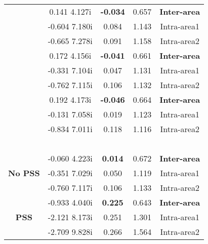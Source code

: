 \documentclass[conference,11pt]{IEEEtran}
\begin{document}
\begin{table}[t]
\begin{tabular}{||c|c|c|c|c||}
\hline 
\multirow{3}{*}{\centering {10\%WG}}    &0.141	 4.127i&	\bf{-0.034}&	0.657& \bf{Inter-area}\\
{}                                          &-0.604	 7.180i&	0.084&	1.143& Intra-area1\\
{}                                          &-0.665	 7.278i&	0.091&	1.158& Intra-area2\\ \hline
\multirow{3}{*}{\centering {25\%WG}}   &0.172	 4.156i&	\bf{-0.041}&	0.661& \bf{Inter-area}\\ 
{}                                          &-0.331	 7.104i&	0.047&	1.131& Intra-area1\\ 
{}                                         &-0.762	 7.115i&	0.106&	1.132& Intra-area2\\ \hline
\multirow{3}{*}{\centering {35\%WG}}    &0.192	 4.173i&	\bf{-0.046}&	0.664& \bf{Inter-area}\\ 
{}                                         &-0.131	 7.058i&	0.019&	1.123& Intra-area1\\ 
{}                                          &-0.834	 7.011i&	0.118&	1.116& Intra-area2\\ \hline \hline
\multirow{2}{*}{\parbox{1.1cm}{\\}}  & 
\multirow{2}{*}{\parbox{1.4cm}{}} & 
\multirow{2}{*}{\parbox{1.1cm}{}} & 
\multirow{2}{*}{\parbox{0.8cm}{}} & 
\multirow{2}{*}{\parbox{1.2cm}{}}  \\
{}       &      {}     &          {} &      {}     &       {} \\ \hline
\hline  
\multirow{3}{*}{\bf {No PSS}}    &-0.060	 4.223i&	\bf{0.014}&	0.672& \bf{Inter-area}\\ 
{}                                          &-0.351	 7.029i&	0.050&	1.119& Intra-area1\\ 
{}                                          &-0.760	 7.117i&	0.106&	1.133& Intra-area2\\ \hline \hline
\multirow{3}{*}{\bf {PSS}}    &-0.933	 4.040i&	\bf{0.225}&	0.643& \bf{Inter-area}\\
{}                           &-2.121	 8.173i&	0.251&	1.301& Intra-area1\\
{}                          &-2.709	 9.828i&	0.266&	1.564& Intra-area2\\ \hline
\hline
\end{tabular}
\vspace{-0.20in}
\end{table}
\end{document}
